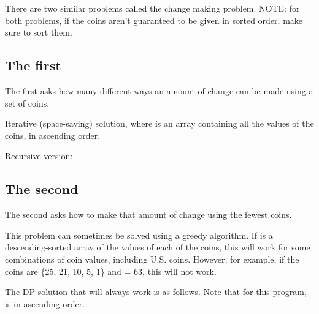 
There are two similar problems called the change making problem. NOTE: for both problems, if the coins aren't guaranteed to be given in sorted order, make sure to sort them.

\subsection*{The first}

The first asks how many different ways an amount of change can be made using a set of coins.

Iterative (space-saving) solution, where  is an array containing all the values of the coins, in ascending order.



Recursive version:



\subsection*{The second}

The second asks how to make that amount of change using the fewest coins.

This problem can sometimes be solved using a greedy algorithm. If  is a descending-sorted array of the values of each of the coins, this will work for some combinations of coin values, including U.S. coins. However, for example, if the coins are \{25, 21, 10, 5, 1\} and  = 63, this will not work.

The DP solution that will always work is as follows. Note that for this program,  is in ascending order.



\newpage